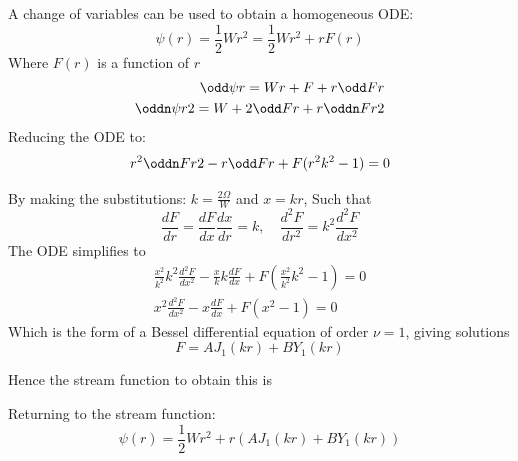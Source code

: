 \documentclass{X:/Documents/Coding/Latex/myreport}
\begin{document}
A change of variables can be used to obtain a homogeneous ODE:
 \[\psi(r) = \frac12 W r^2 = \frac12 W r^2 + rF(r)\]
Where $F(r)$ is a function of $r$
\begin{align*}
    \odd\psi r = Wr + F + r\odd F r\\
    \oddn\psi r2 = W + 2\odd F r + r\oddn Fr 2
\end{align*}
Reducing the ODE to:
\begin{align*}
    r^2 \oddn Fr2 - r \odd Fr + F(r^2k^2 - 1) = 0 
\end{align*}

By making the substitutions: $k = \frac{2\Omega}{W}$ and $x = kr$,
Such that \[\frac{dF}{dr} = \frac{dF}{dx} \frac{dx}{dr} = k,\quad \frac{d^2F}{dr^2} = k^2 \frac{d^2F}{dx^2}\]
The ODE simplifies to
\begin{align*}
    \frac{x^2}{k^2}k^2 \frac{d^2F}{dx^2} - \frac{x}{k}k \frac{dF}{dx} + F(\frac{x^2}{k^2}k^2 - 1) = 0\\
    x^2 \frac{d^2F}{dx^2} - x \frac{dF}{dx} + F(x^2 - 1) = 0
\end{align*}
Which is the form of a Bessel differential equation of order $\nu =1$, giving solutions
\[F = AJ_1(kr) + BY_1(kr)  \]

Hence the stream function to obtain this is

Returning to the stream function:
\[\psi(r) = \frac12 W r^2 + r\left(AJ_1(kr) + BY_1(kr)\right)\]
\end{document}

